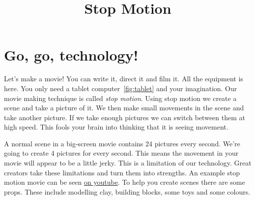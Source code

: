 \documentclass[a5paper]{tufte-book}
\title{Stop Motion}
\author{}
\date{}
\begin{document}
\maketitle

\section*{Go, go, technology!}

Let's make a movie! You can write it, direct it and film it.  All the equipment is here.  You only need a tablet computer~\ref{fig:tablet} and your imagination.  Our movie making technique is called  \textit{stop motion}.  Using stop motion we create a scene and take a picture of it.  We then make small movements in the scene and take another picture.  If we take enough pictures we can switch between them at high speed.  This fools your brain into thinking that it is seeing movement.

A normal scene in a big-screen movie contains 24 pictures every second.  We're going to create 4 pictures for every second.  This means the movement in your movie will appear to be a little jerky.  This is a limitation of our technology.  Great creators take these limitations and turn them into strengths.  An example stop motion movie can be seen  \href{http://youtu.be/c_13_xEB7sw}{on youtube}.  To help you create scenes there are some props.  These include modelling clay, building blocks, some toys and some colours.

\begin{figure}
\end{figure}
\end{document}
